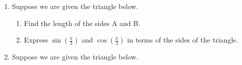 \documentclass{ximera}
\begin{document}
\begin{problem}
\begin{enumerate}
		\begin{enumerate}
	\item Find the length of the sides A and B.
\item Express $\sin\left(\frac{\pi}{4}\right)$ and $\cos\left(\frac{\pi}{4}\right)$ in terms of the sides of the triangle.
\end{enumerate}
\item Suppose we are given the triangle below.  
\begin{image}[1.5in]
\end{image}

		\begin{enumerate}
	\item Find the length of the sides A and B.
\item Express $\sin\left(\frac{\pi}{3}\right)$ and $\cos\left(\frac{\pi}{3}\right)$ in terms of the sides of the triangle.
\end{enumerate}
\item Suppose we are given the triangle below.  
\begin{image}[1.75in]
\end{image}


\end{enumerate}
\end{problem}
\end{document}

